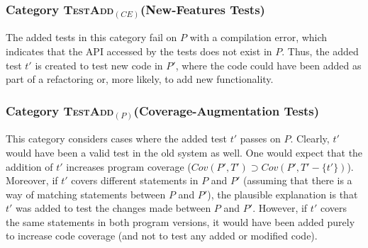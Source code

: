 \documentclass[conference]{IEEEtran}
\newcommand{\lang}[1]{\texttt{\small #1}}
\newcommand{\subject}[1]{\texttt{\small #1}}
\newcommand{\mt}{\mathit}
\newcommand{\covfunc}[2]{\mt{Cov(#1, #2)}}
\newcommand{\cataddce}{\textsc{TestAdd}$_\mt{(CE)}$}
\newcommand{\cataddp}{\textsc{TestAdd}$_\mt{(P)}$}
\begin{document}


\subsubsection{Category \cataddce (New-Features Tests)}
\label{sec:category-addce}

The added tests in this category fail on $P$ with a compilation error,
which indicates that the API accessed by the tests does not exist in
$P$. Thus, the added test $t'$ is created to test new code in $P'$,
where the code could have been added as part of a refactoring or, more
likely, to add new functionality.



\subsubsection{Category \cataddp (Coverage-Augmentation Tests)}
\label{sec:category-addp}

This category considers cases where the added test $t'$ passes on
$P$. Clearly, $t'$ would have been a valid test in the old system as
well. One would expect that the addition of $t'$ increases program
coverage (\ie $\covfunc{P'}{T'} \supset \covfunc{P'}{T' -
  \{t'\}}$). Moreover, if $t'$ covers different statements in $P$ and
$P'$ (assuming that there is a way of matching statements between $P$
and $P'$), the plausible explanation is that $t'$ was added to test
the changes made between $P$ and $P'$. However, if $t'$ covers the
same statements in both program versions, it would have been added
purely to increase code coverage (and not to test any added or
modified code).
\end{document}
